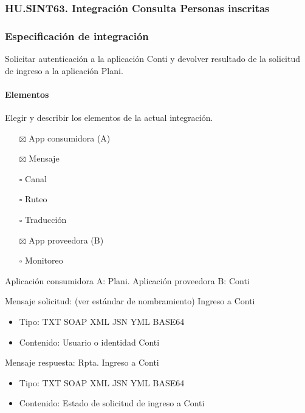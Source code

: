 \documentclass[
  paper=a4,
  ,captions=tableheading
]{scrartcl}
\providecommand{\tightlist}{%
  \setlength{\itemsep}{0pt}\setlength{\parskip}{0pt}}
\begin{document}
\subsubsection{HU.SINT63. Integración Consulta Personas
inscritas}\label{sec:hu.sint63.-integraciuxf3n-consulta-personas-inscritas}

\subsubsection{Especificación de
integración}\label{sec:especificaciuxf3n-de-integraciuxf3n-5}

Solicitar autenticación a la aplicación Conti y devolver resultado de la
solicitud de ingreso a la aplicación Plani.

\paragraph{Elementos}\label{sec:elementos-5}

Elegir y describir los elementos de la actual integración.

\begin{itemize}
\tightlist
\item[$\boxtimes$]
  App consumidora (A)
\item[$\boxtimes$]
  Mensaje
\item[$\square$]
  Canal
\item[$\square$]
  Ruteo
\item[$\square$]
  Traducción
\item[$\boxtimes$]
  App proveedora (B)
\item[$\square$]
  Monitoreo
\end{itemize}

Aplicación consumidora A: Plani. Aplicación proveedora B: Conti

Mensaje solicitud: (ver estándar de nombramiento) Ingreso a Conti

\begin{itemize}
\tightlist
\item
  Tipo: TXT \textbar{} SOAP \textbar{} XML \textbar{} JSN \textbar{} YML
  \textbar{} BASE64
\item
  Contenido: Usuario o identidad Conti
\end{itemize}

Mensaje respuesta: Rpta. Ingreso a Conti

\begin{itemize}
\tightlist
\item
  Tipo: TXT \textbar{} SOAP \textbar{} XML \textbar{} JSN \textbar{} YML
  \textbar{} BASE64
\item
  Contenido: Estado de solicitud de ingreso a Conti
\end{itemize}
\end{document}

